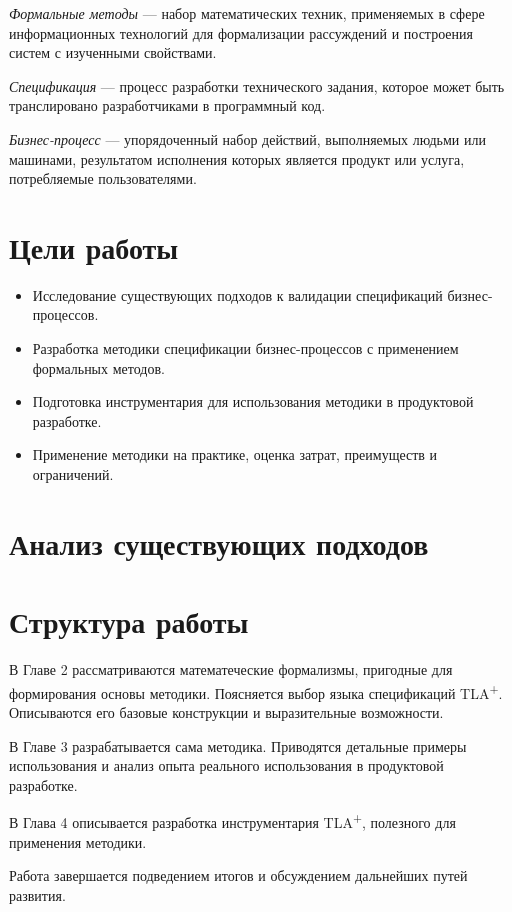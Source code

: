 \documentclass[14pt, openany]{book}
\newcommand{\tla}{TLA\textsuperscript{+}}
\begin{document}
\emph{Формальные методы} --- набор математических техник, применяемых в сфере информационных технологий для формализации рассуждений и построения систем с изученными свойствами.

\emph{Спецификация} --- процесс разработки технического задания, которое может быть транслировано разработчиками в программный код.

\emph{Бизнес-процесс} --- упорядоченный набор действий, выполняемых людьми или машинами, результатом исполнения которых является продукт или услуга, потребляемые пользователями.

\section{Цели работы}

\begin{itemize}
  \item Исследование существующих подходов к валидации спецификаций бизнес-процессов.
  \item Разработка методики спецификации бизнес-процессов с применением формальных методов.
  \item Подготовка инструментария для использования методики в продуктовой разработке.
  \item Применение методики на практике, оценка затрат, преимуществ и ограничений.
\end{itemize}

\section{Анализ существующих подходов}

\section{Структура работы}

В Главе 2 рассматриваются математеческие формализмы, пригодные для формирования основы методики. Поясняется выбор языка спецификаций \tla. Описываются его базовые конструкции и выразительные возможности.

В Главе 3 разрабатывается сама методика. Приводятся детальные примеры использования и анализ опыта реального использования в продуктовой разработке. 

В Глава 4 описывается разработка инструментария \tla, полезного для применения методики.

Работа завершается подведением итогов и обсуждением дальнейших путей развития.
\end{document}
